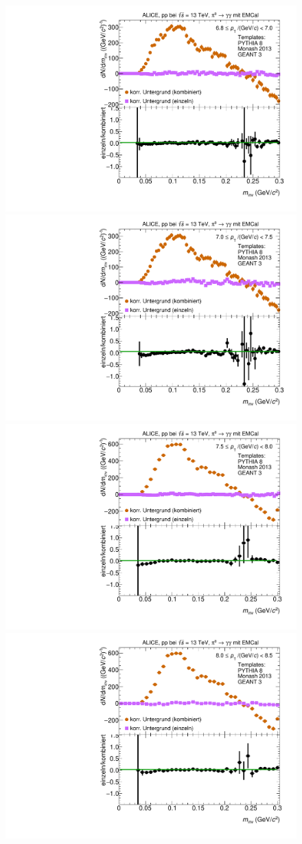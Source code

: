 \begin{figure}[t]
\centering
\begin{multicols}{2}
    \includegraphics[width=.65\linewidth]{Anhang/BackgroundWithRatio28_Data_2016.pdf}\par 
    \includegraphics[width=.65\linewidth]{Anhang/BackgroundWithRatio29_Data_2016.pdf}\par  %
\end{multicols}
\begin{multicols}{2}
    \includegraphics[width=.65\linewidth]{Anhang/BackgroundWithRatio30_Data_2016.pdf}\par
    \includegraphics[width=.65\linewidth]{Anhang/BackgroundWithRatio31_Data_2016.pdf}\par

\end{multicols}
\end{figure}
